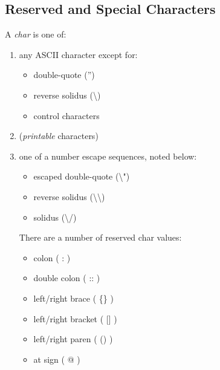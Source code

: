 \documentclass{memarticle}
\begin{document}
{                \subsection{Reserved and Special Characters}
                        A \emph{char} is one of:
                        \begin{enumerate}
                                \item any ASCII character except for:
                                \begin{itemize}
                                        \item double-quote ('') 
                                        \item reverse solidus (\textbackslash)
                                        \item control characters
                                \end{itemize}
                                \item (\emph{printable} characters)
                                \item one of a number escape sequences, noted below:
                                \begin{itemize}
                                        \item escaped double-quote (\textbackslash")
                                        \item reverse solidus (\textbackslash\textbackslash)
                                        \item solidus (\textbackslash/)
                                \end{itemize}
                                There are a number of reserved char values:
                                \begin{itemize}
                                        \item colon ( : )
                                        \item double colon ( :: )
                                        \item left/right brace ( \{\} )
                                        \item left/right bracket ( [] )
                                        \item left/right paren ( () )
                                        \item at sign ( @ )
                                \end{itemize}           
                        \end{enumerate}
                        
}
\end{document}
